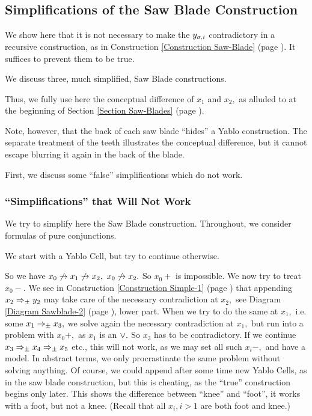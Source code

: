 \clearpage




\clearpage
\subsection{
Simplifications of the Saw Blade Construction
}


\label{Section Simplifications}


\ecs


We show here that it is not necessary to make the $y_{ \sigma,i}$
contradictory
in a recursive construction, as in
Construction 
\ref{Construction Saw-Blade} (page 
\pageref{Construction Saw-Blade}).
It suffices to prevent them to be true.

We discuss three, much simplified, Saw Blade constructions.

Thus, we fully use here the conceptual difference of $x_{1}$ and $x_{2},$
as alluded to at the beginning of
Section \ref{Section Saw-Blades} (page \pageref{Section Saw-Blades}).

Note, however, that the back of each saw blade ``hides'' a Yablo
construction. The separate treatment of the teeth illustrates the
conceptual difference, but it cannot escape blurring it again in
the back of the blade.


First, we discuss some ``false'' simplifications which do not work.
\subsubsection{
``Simplifications'' that Will Not Work
}


\label{Section NotWork}


We try to simplify here the Saw Blade construction.
Throughout, we consider formulas of pure conjunctions.

We start with a Yablo Cell, but try to continue otherwise.

So we have $x_{0} \not\rightarrow x_{1} \not\rightarrow x_{2},$ $x_{0} \not\rightarrow x_{2}.$ So $x_{0}+$
is impossible. We now try to treat $x_{0}-.$
We see in Construction 
\ref{Construction Simple-1} (page 
\pageref{Construction Simple-1})
that appending $x_{2} \Rightarrow_{ \pm }y_{2}$ may take care of the necessary
contradiction at $x_{2},$
see Diagram \ref{Diagram Sawblade-2} (page \pageref{Diagram Sawblade-2}),
lower part.
When we try to do the same at $x_{1},$ i.e. some $x_{1} \Rightarrow_{ \pm
}x_{3},$ we solve again
the necessary contradiction at $x_{1},$ but run into a problem with
$x_{0}+,$
as $x_{1}$ is an $ \vee.$ So $x_{3}$ has to be contradictory. If we
continue
$x_{3} \Rightarrow_{ \pm }x_{4} \Rightarrow_{ \pm }x_{5}$ etc., this will not work, as
we may set all such $x_{i}-,$
and have a model. In abstract terms, we only procrastinate the same
problem
without solving anything.
Of course, we could append after some time new
Yablo Cells, as in the saw blade construction, but this is cheating,
as the ``true'' construction begins only later.
This shows the difference between ``knee'' and ``foot'', it works with
a foot, but not a knee. (Recall that all $x_{i},i>1$ are both foot and
knee.)

